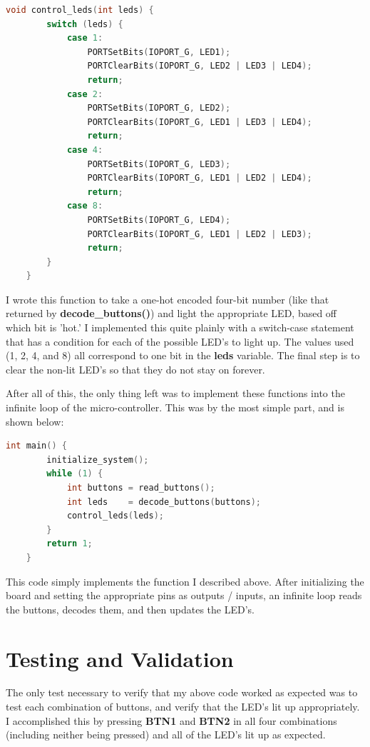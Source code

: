 \documentclass[a4paper, 12pt]{article}
\begin{document}
	\begin{mdframed}[backgroundcolor=code-gray, roundcorner=10pt,
								innerleftmargin=5, innertopmargin=5, innerbottommargin=5]	
	\begin{lstlisting}[language=C, caption=Controlling the LED's, tabsize=2]
	void control_leds(int leds) {
		switch (leds) {
			case 1:
				PORTSetBits(IOPORT_G, LED1);
				PORTClearBits(IOPORT_G, LED2 | LED3 | LED4);
				return;
			case 2:
				PORTSetBits(IOPORT_G, LED2);
				PORTClearBits(IOPORT_G, LED1 | LED3 | LED4);
				return;
			case 4:
				PORTSetBits(IOPORT_G, LED3);
				PORTClearBits(IOPORT_G, LED1 | LED2 | LED4);
				return;
			case 8:
				PORTSetBits(IOPORT_G, LED4);
				PORTClearBits(IOPORT_G, LED1 | LED2 | LED3);
				return;
		}
	}
	\end{lstlisting}
	\end{mdframed}
	
I wrote this function to take a one-hot encoded four-bit number (like that returned by \textbf{decode\_buttons()}) and light the appropriate LED, based off which bit is 'hot.' I implemented this quite plainly with a switch-case statement that has a condition for each of the possible LED's to light up. The values used (1, 2, 4, and 8) all correspond to one bit in the \textbf{leds} variable. The final step is to clear the non-lit LED's so that they do not stay on forever.

After all of this, the only thing left was to implement these functions into the infinite loop of the micro-controller. This was by the most simple part, and is shown below:\newpage

	\begin{mdframed}[backgroundcolor=code-gray, roundcorner=10pt,
								innerleftmargin=5, innertopmargin=5, innerbottommargin=5]	
	\begin{lstlisting}[language=C, caption=Main Infinite Loop, tabsize=2]
	int main() {
		initialize_system();
		while (1) {
			int buttons = read_buttons();	
			int leds    = decode_buttons(buttons);
			control_leds(leds);
		}
		return 1;
	}
	\end{lstlisting}
	\end{mdframed}

This code simply implements the function I described above. After initializing the board and setting the appropriate pins as outputs / inputs, an infinite loop reads the buttons, decodes them, and then updates the LED's.

\section{Testing and Validation}
The only test necessary to verify that my above code worked as expected was to test each combination of buttons, and verify that the LED's lit up appropriately. I accomplished this by pressing \textbf{BTN1} and \textbf{BTN2} in all four combinations (including neither being pressed) and all of the LED's lit up as expected.
\end{document}
